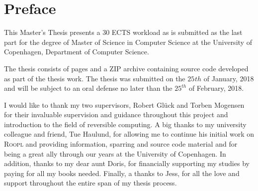 \chapter*{Preface}

This Master's Thesis presents a 30 ECTS workload as is submitted as the last part for the degree of Master of Science in Computer Science at the University of Copenhagen, Department of Computer Science.

The thesis consists of \pageref*{LastPage} pages and a ZIP archive containing source code developed as part of the thesis work. The thesis was submitted on the $25^{}th$ of January, 2018 and will be subject to an oral defense no later than the $25^{th}$ of February, 2018.

I would like to thank my two supervisors, Robert Glück and Torben Mogensen for their invaluable supervision and guidance throughout this project and introduction to the field of reversible computing. A big thanks to my university colleague and friend, Tue Haulund, for allowing me to continue his initial work on \textsc{Roopl} and providing information, sparring and source code material and for being a great ally through our years at the University of Copenhagen. In addition, thanks to my dear aunt Doris, for financially supporting my studies by paying for all my books needed. Finally, a thanks to Jess, for all the love and support throughout the entire span of my thesis process.
